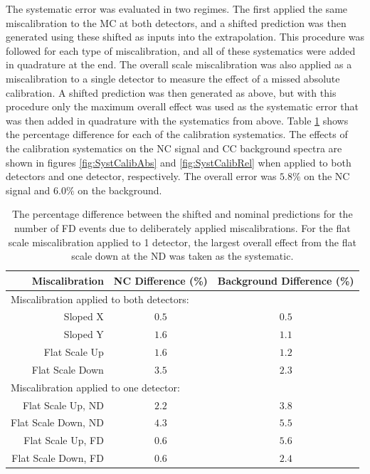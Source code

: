 The systematic error was evaluated in two regimes. The first applied the same miscalibration to the MC at both detectors, and a shifted prediction was then generated using these shifted as inputs into the extrapolation. This procedure was followed for each type of miscalibration, and all of these systematics were added in quadrature at the end. The overall scale miscalibration was also applied as a miscalibration to a single detector to measure the effect of a missed absolute calibration. A shifted prediction was then generated as above, but with this procedure only the maximum overall effect was used as the systematic error that was then added in quadrature with the systematics from above. Table \ref{tab:SystCalib} shows the percentage difference for each of the calibration systematics. The effects of the calibration systematics on the NC signal and CC background spectra are shown in figures \ref{fig:SystCalibAbs} and \ref{fig:SystCalibRel} when applied to both detectors and one detector, respectively. The overall error was $5.8\%$ on the NC signal and $6.0\%$ on the background.
\begin{table}[htb]
  \begin{center}
    \begin{tabular}{r c c}
      \hline\hline
      Miscalibration & NC Difference (\%) & Background Difference (\%) \\
      \hline
      \multicolumn{3}{l}{Miscalibration applied to both detectors:} \\
      Sloped X & $0.5$ & $0.5$ \\
      Sloped Y & $1.6$ & $1.1$ \\
      Flat Scale Up & $1.6$ & $1.2$ \\
      Flat Scale Down & $3.5$ & $2.3$ \\
      \multicolumn{3}{l}{Miscalibration applied to one detector:} \\
      Flat Scale Up, ND & $2.2$ & $3.8$ \\
      Flat Scale Down, ND & $4.3$ & $5.5$ \\
      Flat Scale Up, FD & $0.6$ & $5.6$ \\
      Flat Scale Down, FD & $0.6$ & $2.4$ \\
      \hline
    \end{tabular}
    \caption[Calibration Systematic Errors]{The percentage difference between the shifted and nominal predictions for the number of FD events due to deliberately applied miscalibrations. For the flat scale miscalibration applied to 1 detector, the largest overall effect from the flat scale down at the ND was taken as the systematic.}
    \label{tab:SystCalib}
  \end{center}
\end{table}

